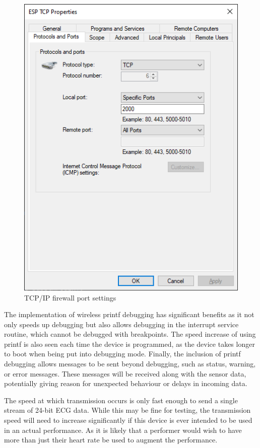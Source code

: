 \begin{figure}[!ht]
  \caption{TCP/IP firewall port settings}\label{fig:firewall}
  \centering
  \includegraphics[width=1\columnwidth/2]{chapters/development/FIREWALL}
\end{figure}

The implementation of wireless printf debugging has significant benefits as it not only speeds up debugging
but also allows debugging in the interrupt service routine, which cannot be debugged with breakpoints.
The speed increase of using printf is also seen each time the device is programmed,
as the device takes longer to boot when being put into debugging mode.
Finally, the inclusion of printf debugging allows messages to be sent beyond debugging, such as status, warning, or error messages.
These messages will be received along with the sensor data, potentially giving reason for unexpected behaviour or delays in incoming data.

The speed at which transmission occurs is only fast enough to send a single stream of 24-bit ECG data.
While this may be fine for testing,
the transmission speed will need to increase significantly if this device is ever intended to be used in an actual performance.
As it is likely that a performer would wish to have more than just their heart rate be used to augment the performance.

